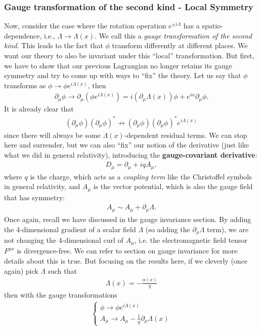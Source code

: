 \documentclass[a4paper,11pt]{article}
\numberwithin{equation}{section}
\theoremstyle{definition}
\newcommand{\p}{\partial}
\begin{document}
\subsubsection{Gauge transformation of the second kind - Local Symmetry}
Now, consider the case where the rotation operation $e^{\pm i \Lambda}$ has a spatio-dependence, i.e., $\Lambda \to \Lambda(x)$. We call this a \textit{gauge transformation of the second kind}. This leads to the fact that $\phi$ transform differently at different places. We want our theory to also be invariant under this ``local'' transformation. But first, we have to show that our previous Lagrangian no longer retains its gauge symmetry and try to come up with ways to ``fix'' the theory. Let us say that $\phi$ transforms as $\phi \to \phi e^{i\Lambda(x)}$, then
\begin{align}
\p_\mu \phi \to \p_\mu (\phi e^{i\Lambda(x)}) = i(\p_\mu \Lambda(x))\phi + e^{i\alpha}\p_\mu \phi.
\end{align}
It is already clear that 
\begin{align}
(\p_\mu \phi)(\p_\mu \phi)^* \not\to (\p_\mu \phi)(\p_\mu \phi)^* e^{i\Lambda(x)}
\end{align}
since there will always be some $\Lambda(x)$-dependent residual terms. We can stop here and surrender, but we can also ``fix'' our notion of the derivative (just like what we did in general relativity), introducing the \textbf{gauge-covariant derivative}:
\begin{align}
D_\mu = \p_\mu + iqA_\mu,
\end{align}
where $q$ is the charge, which acts as a \textit{coupling term} like the Christoffel symbols in general relativity, and $A_\mu$ is the vector potential, which is also the gauge field that has symmetry:
\begin{align}
A_\mu \sim A_\mu + \p_\mu\Lambda.
\end{align}
Once again, recall we have discussed in the gauge invariance section. By adding the 4-dimensional gradient of a scalar field $\Lambda$ (so adding the $\p_\mu \Lambda$ term), we are not changing the 4-dimensional curl of $A_\mu$, i.e. the electromagnetic field tensor $F^{\mu\nu}$ is divergence-free. We can refer to section on gauge invariance for more details about this is true. But focusing on the results here, if we cleverly (once again) pick $\Lambda$ such that
\begin{align}
\Lambda(x) = -\frac{\alpha(x)}{q}
\end{align}
then with the gauge transformations
\begin{align}
\begin{cases}
\phi \to \phi e^{i\Lambda(x)}\\
A_\mu \to A_\mu - \frac{1}{q}\p_\mu\Lambda(x)
\end{cases}
\end{align}
\end{document}
